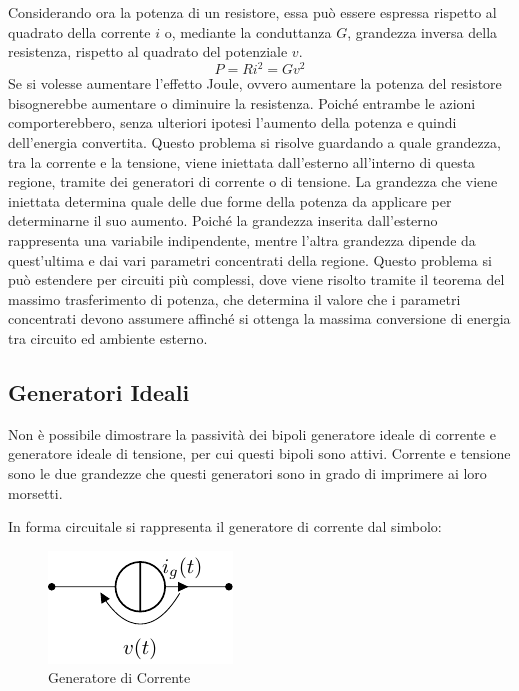 \documentclass{article}
\numberwithin{equation}{subsection}
\begin{document}
Considerando ora la potenza di un resistore, essa può essere espressa rispetto al quadrato della corrente $i$ o, mediante la conduttanza $G$, grandezza inversa della resistenza, 
rispetto al quadrato del potenziale $v$. 
\begin{equation*}
    P=Ri^2=Gv^2
\end{equation*}
Se si volesse aumentare l'effetto Joule, ovvero aumentare la potenza del resistore bisognerebbe aumentare o diminuire la resistenza. Poiché entrambe le azioni comporterebbero, 
senza ulteriori ipotesi l'aumento della potenza e quindi dell'energia convertita. Questo problema si risolve guardando a quale grandezza, tra la corrente e la tensione, 
viene iniettata dall'esterno all'interno di questa regione, tramite dei generatori di corrente o di tensione. La grandezza che viene iniettata determina quale delle due 
forme della potenza da applicare per determinarne il suo aumento. Poiché la grandezza inserita dall'esterno rappresenta una variabile indipendente, mentre l'altra 
grandezza dipende da quest'ultima e dai vari parametri concentrati della regione. Questo problema si può estendere per circuiti più complessi, dove viene risolto tramite 
il teorema del massimo trasferimento di potenza, che determina il valore che i parametri concentrati devono assumere affinché si ottenga la massima conversione di energia 
tra circuito ed ambiente esterno.  

\subsection{Generatori Ideali}

Non è possibile dimostrare la passività dei bipoli generatore ideale di corrente e generatore ideale di tensione, per cui questi bipoli sono attivi. Corrente e tensione sono 
le due grandezze che questi generatori sono in grado di imprimere ai loro morsetti. 

In forma circuitale si rappresenta il generatore di corrente dal simbolo:

\begin{figure}[H]%
    \centering
    \includegraphics{generatore-corrente.pdf}
    \caption{Generatore di Corrente}
    \label{fig:generatore-corrente}
\end{figure}
\end{document}
